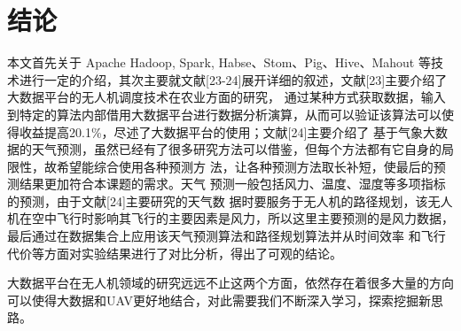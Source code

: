 \documentclass[UTF8,a4paper,10pt,nocolorlinks]{ctexart}
\begin{document}
\section{结论}
本文首先关于 Apache Hadoop, Spark, Habse、Stom、Pig、Hive、Mahout 等技术进行一定的介绍，其次主要就文献[23-24]展开详细的叙述，文献[23]主要介绍了大数据平台的无人机调度技术在农业方面的研究，
通过某种方式获取数据，输入到特定的算法内部借用大数据平台进行数据分析演算，从而可以验证该算法可以使得收益提高20.1\%，尽述了大数据平台的使用；文献[24]主要介绍了
基于气象大数据的天气预测，虽然已经有了很多研究方法可以借鉴，但每个方法都有它自身的局限性，故希望能综合使用各种预测方
法，让各种预测方法取长补短，使最后的预测结果更加符合本课题的需求。天气
预测一般包括风力、温度、湿度等多项指标的预测，由于文献[24]主要研究的天气数
据时要服务于无人机的路径规划，该无人机在空中飞行时影响其飞行的主要因素是风力，所以这里主要预测的是风力数据，最后通过在数据集合上应用该天气预测算法和路径规划算法并从时间效率
和飞行代价等方面对实验结果进行了对比分析，得出了可观的结论。\par
大数据平台在无人机领域的研究远远不止这两个方面，依然存在着很多大量的方向可以使得大数据和UAV更好地结合，对此需要我们不断深入学习，探索挖掘新思路。

\end{document}
